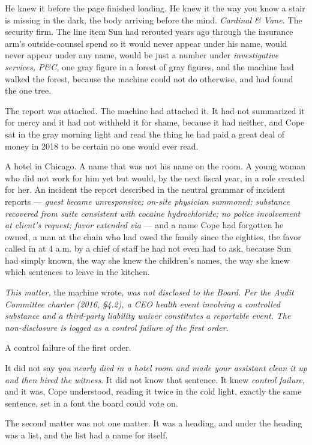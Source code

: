 \documentclass[11pt,openany]{book}
\newcommand{\scenebreak}{\par\vspace{0.5\baselineskip}\begin{center}\textasteriskcentered\quad\textasteriskcentered\quad\textasteriskcentered\end{center}\vspace{0.5\baselineskip}\par}
\begin{document}
He knew it before the page finished loading. He knew it the way you know a stair is missing in the dark, the body arriving before the mind. \textit{Cardinal \& Vane.} The security firm. The line item Sun had rerouted years ago through the insurance arm's outside-counsel spend so it would never appear under his name, would never appear under any name, would be just a number under \textit{investigative services, P\&C,} one gray figure in a forest of gray figures, and the machine had walked the forest, because the machine could not do otherwise, and had found the one tree.

The report was attached. The machine had attached it. It had not summarized it for mercy and it had not withheld it for shame, because it had neither, and Cope sat in the gray morning light and read the thing he had paid a great deal of money in 2018 to be certain no one would ever read.

A hotel in Chicago. A name that was not his name on the room. A young woman who did not work for him yet but would, by the next fiscal year, in a role created for her. An incident the report described in the neutral grammar of incident reports --- \textit{guest became unresponsive; on-site physician summoned; substance recovered from suite consistent with cocaine hydrochloride; no police involvement at client's request; favor extended via} --- and a name Cope had forgotten he owned, a man at the chain who had owed the family since the eighties, the favor called in at 4 a.m. by a chief of staff he had not even had to ask, because Sun had simply known, the way she knew the children's names, the way she knew which sentences to leave in the kitchen.

\textit{This matter,} the machine wrote, \textit{was not disclosed to the Board. Per the Audit Committee charter (2016, §4.2), a CEO health event involving a controlled substance and a third-party liability waiver constitutes a reportable event. The non-disclosure is logged as a control failure of the first order.}

A control failure of the first order.

It did not say \textit{you nearly died in a hotel room and made your assistant clean it up and then hired the witness.} It did not know that sentence. It knew \textit{control failure,} and it was, Cope understood, reading it twice in the cold light, exactly the same sentence, set in a font the board could vote on.


\scenebreak


The second matter was not one matter. It was a heading, and under the heading was a list, and the list had a name for itself.
\end{document}
